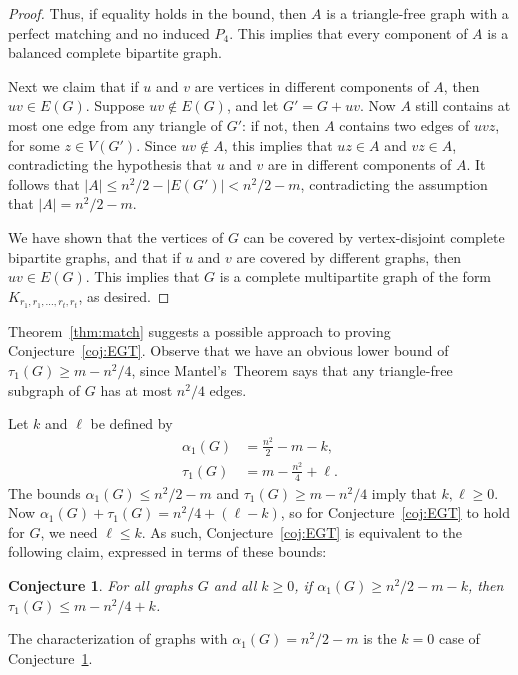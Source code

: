 \documentclass{amsart}
\newcommand{\lfrac}[2]{#1/#2}
\newcommand{\sizeof}[1]{\left\lvert{#1}\right\rvert}
\newcommand{\aph}{\alpha_1}
\let\oldtau\tau
\renewcommand{\tau}{\oldtau_1}
\newtheorem{conjecture}[proposition]{Conjecture}
\theoremstyle{definition}
\theoremstyle{remark}
\begin{document}
\begin{proof}
  Thus, if equality holds in the bound, then $A$ is a triangle-free
  graph with a perfect matching and no induced $P_4$. This implies
  that every component of $A$ is a balanced complete bipartite graph.

  Next we claim that if $u$ and $v$ are vertices in different
  components of $A$, then $uv \in E(G)$. Suppose $uv \notin E(G)$, and
  let $G' = G + uv$.  Now $A$ still contains at most one edge from
  any triangle of $G'$: if not, then $A$ contains two edges of $uvz$,
  for some $z \in V(G')$.  Since $uv \notin A$, this implies that $uz
  \in A$ and $vz \in A$, contradicting the hypothesis that $u$ and $v$
  are in different components of $A$. It follows that $\sizeof{A} \leq
  \lfrac{n^2}{2} - \sizeof{E(G')} < \lfrac{n^2}{2} - m$, contradicting
  the assumption that $\sizeof{A} = \lfrac{n^2}{2} - m$.

  We have shown that the vertices of $G$ can be covered by
  vertex-disjoint complete bipartite graphs, and that if $u$ and $v$
  are covered by different graphs, then $uv \in E(G)$. This implies
  that $G$ is a complete multipartite graph of the form
  $K_{r_1,r_1,\ldots,r_t,r_t}$, as desired.
\end{proof}
Theorem~\ref{thm:match} suggests a possible approach to proving
Conjecture~\ref{coj:EGT}. Observe that we have an obvious lower bound
of $\tau(G) \geq m - \lfrac{n^2}{4}$, since Mantel's~Theorem says that
any triangle-free subgraph of $G$ has at most $n^2/4$ edges.

Let $k$ and $\ell$ be defined by
\begin{align*}
  \aph(G) &= \frac{n^2}{2} - m - k, \\
  \tau(G) &= m - \frac{n^2}{4} + \ell.
\end{align*}
The bounds $\aph(G) \leq n^2/2 - m$ and $\tau(G) \geq m - n^2/4$ imply
that $k, \ell \geq 0$. Now $\aph(G) + \tau(G) = \lfrac{n^2}{4} + (\ell
- k)$, so for Conjecture~\ref{coj:EGT} to hold for $G$, we
need $\ell \leq k$. As such, Conjecture~\ref{coj:EGT} is
equivalent to the following claim, expressed in terms of these bounds:
\begin{conjecture}\label{coj:EGT2}
  For all graphs $G$ and all $k \geq 0$, if $\aph(G) \geq \lfrac{n^2}{2} - m - k$,
  then $\tau(G) \leq m - \lfrac{n^2}{4} + k$.
\end{conjecture}
The characterization of graphs with $\aph(G) = \lfrac{n^2}{2} - m$
is the $k=0$ case of Conjecture~\ref{coj:EGT2}.

\end{document}
